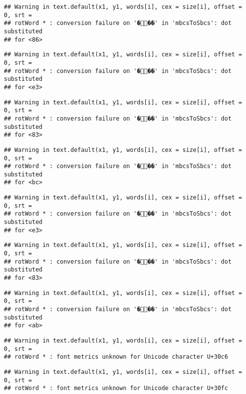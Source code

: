 \documentclass[]{article}
\begin{document}
\begin{verbatim}
## Warning in text.default(x1, y1, words[i], cex = size[i], offset = 0, srt =
## rotWord * : conversion failure on '���' in 'mbcsToSbcs': dot substituted
## for <86>
\end{verbatim}

\begin{verbatim}
## Warning in text.default(x1, y1, words[i], cex = size[i], offset = 0, srt =
## rotWord * : conversion failure on '���' in 'mbcsToSbcs': dot substituted
## for <e3>
\end{verbatim}

\begin{verbatim}
## Warning in text.default(x1, y1, words[i], cex = size[i], offset = 0, srt =
## rotWord * : conversion failure on '���' in 'mbcsToSbcs': dot substituted
## for <83>
\end{verbatim}

\begin{verbatim}
## Warning in text.default(x1, y1, words[i], cex = size[i], offset = 0, srt =
## rotWord * : conversion failure on '���' in 'mbcsToSbcs': dot substituted
## for <bc>
\end{verbatim}

\begin{verbatim}
## Warning in text.default(x1, y1, words[i], cex = size[i], offset = 0, srt =
## rotWord * : conversion failure on '���' in 'mbcsToSbcs': dot substituted
## for <e3>
\end{verbatim}

\begin{verbatim}
## Warning in text.default(x1, y1, words[i], cex = size[i], offset = 0, srt =
## rotWord * : conversion failure on '���' in 'mbcsToSbcs': dot substituted
## for <83>
\end{verbatim}

\begin{verbatim}
## Warning in text.default(x1, y1, words[i], cex = size[i], offset = 0, srt =
## rotWord * : conversion failure on '���' in 'mbcsToSbcs': dot substituted
## for <ab>
\end{verbatim}

\begin{verbatim}
## Warning in text.default(x1, y1, words[i], cex = size[i], offset = 0, srt =
## rotWord * : font metrics unknown for Unicode character U+30c6
\end{verbatim}

\begin{verbatim}
## Warning in text.default(x1, y1, words[i], cex = size[i], offset = 0, srt =
## rotWord * : font metrics unknown for Unicode character U+30fc
\end{verbatim}
\end{document}
